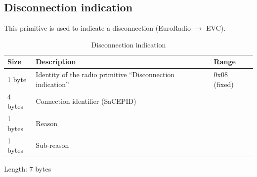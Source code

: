 \documentclass[nocc]{template/openetcs_report}
\begin{document}
\subsection{Disconnection indication}
This primitive is used to indicate a disconnection (EuroRadio $\rightarrow$ EVC).
 			\begin{longtable}{|l|l|l|}
				\caption{Disconnection indication}\\ 
				\hline
				
					\begin{minipage}[t]{0.1\linewidth} \textbf{Size}	\end{minipage}
				&	\begin{minipage}[t]{0.5\linewidth} \textbf{Description}	\end{minipage}
				&	\begin{minipage}[t]{0.3\linewidth} \textbf{Range} \end{minipage} \\
				
				\hline
					 \begin{minipage}[t]{0.1\linewidth}1 byte \end{minipage}
					&\begin{minipage}[t]{0.6\linewidth}Identity of the radio primitive "`Disconnection indication"'	\end{minipage}
					&\begin{minipage}[t]{0.3\linewidth}0x08 (fixed) \end{minipage} \\
					
				\hline
					 \begin{minipage}[t]{0.1\linewidth}4 bytes \end{minipage}
					&\begin{minipage}[t]{0.6\linewidth}Connection identifier (SaCEPID)	\end{minipage}
					&\begin{minipage}[t]{0.3\linewidth} \end{minipage} \\
					
				\hline
						\begin{minipage}[t]{0.1\linewidth}1 bytes \end{minipage}
					&\begin{minipage}[t]{0.6\linewidth}Reason \end{minipage}
					&\begin{minipage}[t]{0.3\linewidth} \end{minipage} \\
					
				\hline
						\begin{minipage}[t]{0.1\linewidth}1 bytes \end{minipage}
					&\begin{minipage}[t]{0.6\linewidth}Sub-reason \end{minipage}
					&\begin{minipage}[t]{0.3\linewidth} \end{minipage} \\
					
				\hline
			\end{longtable}
			Length: 7 bytes

\end{document}
